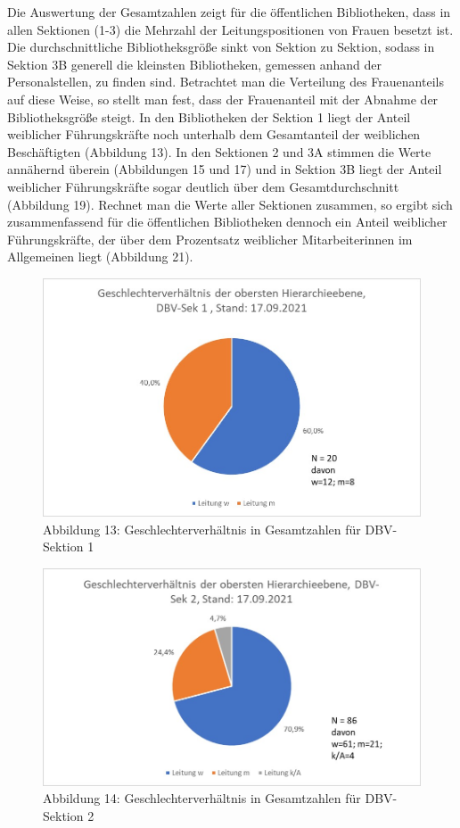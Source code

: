 \documentclass[a4paper,
fontsize=11pt,
oneside,
numbers=noperiodatend,
parskip=half-,
bibliography=totoc,
final
]{scrartcl}
\begin{document}
Die Auswertung der Gesamtzahlen zeigt für die öffentlichen Bibliotheken,
dass in allen Sektionen (1-3) die Mehrzahl der Leitungspositionen von
Frauen besetzt ist. Die durchschnittliche Bibliotheksgröße sinkt von
Sektion zu Sektion, sodass in Sektion 3B generell die kleinsten
Bibliotheken, gemessen anhand der Personalstellen, zu finden sind.
Betrachtet man die Verteilung des Frauenanteils auf diese Weise, so
stellt man fest, dass der Frauenanteil mit der Abnahme der
Bibliotheksgröße steigt. In den Bibliotheken der Sektion 1 liegt der
Anteil weiblicher Führungskräfte noch unterhalb dem Gesamtanteil der
weiblichen Beschäftigten (Abbildung 13). In den Sektionen 2 und 3A
stimmen die Werte annähernd überein (Abbildungen 15 und 17) und in
Sektion 3B liegt der Anteil weiblicher Führungskräfte sogar deutlich
über dem Gesamtdurchschnitt (Abbildung 19). Rechnet man die Werte aller
Sektionen zusammen, so ergibt sich zusammenfassend für die öffentlichen
Bibliotheken dennoch ein Anteil weiblicher Führungskräfte, der über dem
Prozentsatz weiblicher Mitarbeiterinnen im Allgemeinen liegt (Abbildung
21).

\begin{figure}
\centering
\includegraphics{img/Abb_13_DBV-Sek1_gesamt.jpg}
\caption{Abbildung 13: Geschlechterverhältnis in Gesamtzahlen für
DBV-Sektion 1}
\end{figure}

\begin{figure}
\centering
\includegraphics{img/Abb_14_DBV-Sek2_gesamt.jpg}
\caption{Abbildung 14: Geschlechterverhältnis in Gesamtzahlen für
DBV-Sektion 2}
\end{figure}
\end{document}

